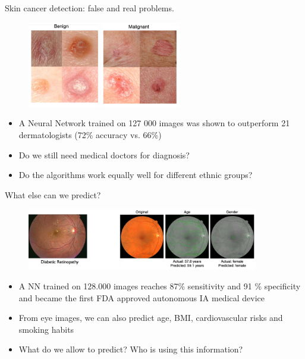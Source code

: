 \documentclass[xcolor=pdftex,dvipsnames,table]{beamer}
\begin{document}
\begin{frame}{Skin cancer detection: false and real problems.}
\begin{figure}[htb]
\includegraphics[width=0.6\textwidth]{../graphics/dermatology.pdf}
\end{figure}
\begin{itemize}
\item<1-> A Neural Network trained on 127 000 images was shown to outperform 21 dermatologists (72\% accuracy vs. 66\%) \cite{Esteva2017} 
\item<2-> Do we still need medical doctors for diagnosis? 
\item<3-> Do the algorithms work equally well for different ethnic groups? 
\end{itemize}
\end{frame}

\begin{frame}{What else can we predict?}
\begin{figure}[htb]
\includegraphics[width=0.9\textwidth]{../graphics/retinopathy.pdf}
\end{figure}
\begin{itemize}
\item<1-> A NN trained on 128.000 images reaches 87\% sensitivity and 91 \% specificity and became the first FDA approved autonomous IA medical device \cite{Abramoff2018}
\item<2-> From eye images, we can also predict age, BMI, cardiovascular risks and smoking habits \cite{Poplin2018}
\item<3-> What do we allow to predict? Who is using this information?
\end{itemize}
\end{frame}
\end{document}

